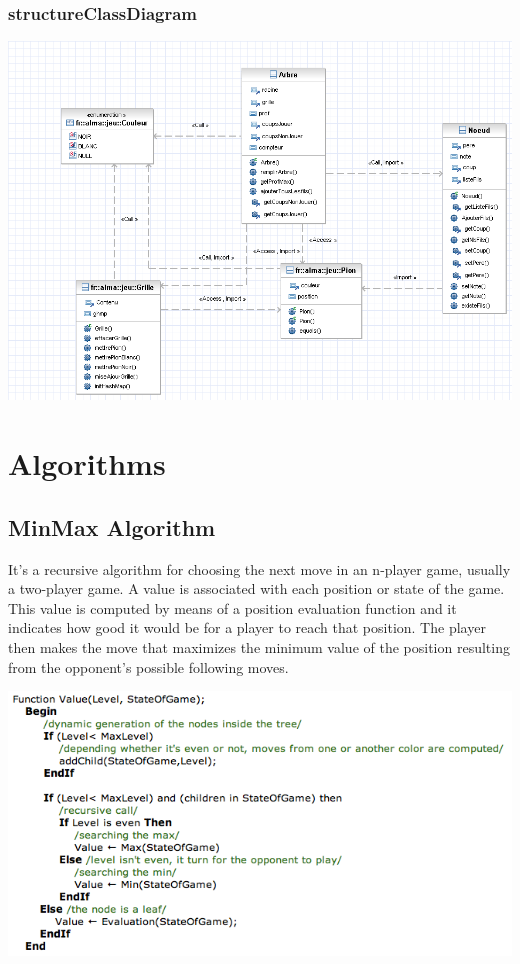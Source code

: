 \documentclass{report}
\begin{document}
\subsection{structureClassDiagram}
\begin{center}
\includegraphics[scale=0.50]{images/fralmastructureClassDiagram}
\end{center}


\chapter{Algorithms}


\section{MinMax Algorithm }

It's a recursive algorithm for choosing the next move in an n-player game, usually a two-player game. A value is associated with each position or state of the game. This value is computed by means of a position evaluation function and it indicates how good it would be for a player to reach that position. The player then makes the move that maximizes the minimum value of the position resulting from the opponent's possible following moves.\\

\begin{center}
\includegraphics[scale=0.60]{images/MinMax.png}
\end{center}
\end{document}
